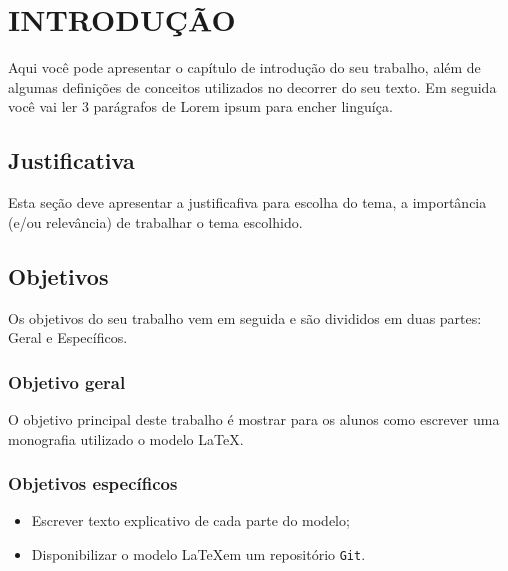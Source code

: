 
\chapter{INTRODUÇÃO}

Aqui você pode apresentar o capítulo de introdução do seu trabalho, além de algumas definições de conceitos utilizados no decorrer do seu  texto. Em seguida você vai ler 3 parágrafos de Lorem ipsum para encher linguíça.
 
\lipsum[3-5]


\section{Justificativa}

Esta seção deve apresentar a justificafiva para escolha do tema, a importância (e/ou relevância) de trabalhar o tema escolhido.


\section{Objetivos}

Os objetivos do seu trabalho vem em seguida e são divididos em duas partes:  Geral e Específicos.

\subsection{Objetivo geral}
O objetivo principal deste trabalho é mostrar para os alunos como escrever uma monografia utilizado o modelo \LaTeX.

\subsection{Objetivos específicos}

\begin{itemize}
 
	\item Escrever texto explicativo de cada parte do modelo;
	\item Disponibilizar o modelo \LaTeX em um repositório \texttt{Git}.
\end{itemize}


